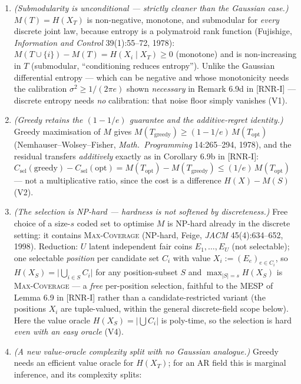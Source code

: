 \documentclass[
]{article}
\begin{document}
\begin{enumerate}
\item \emph{(Submodularity is unconditional --- strictly cleaner than the
Gaussian case.)} $M(T)=H(X_T)$ is non-negative, monotone, and submodular
for \emph{every} discrete joint law, because entropy is a polymatroid rank
function (Fujishige, \emph{Information and Control} 39(1):55--72, 1978):
$M(T\cup\{i\})-M(T)=H(X_i\mid X_T)\ge 0$ (monotone) and is non-increasing in
$T$ (submodular, ``conditioning reduces entropy''). Unlike the Gaussian
differential entropy --- which can be negative and whose monotonicity needs
the calibration $\sigma^2\ge 1/(2\pi e)$ shown \emph{necessary} in Remark
6.9d in [RNR-I] --- discrete entropy needs \emph{no} calibration: that noise floor
simply vanishes (V1).
\item \emph{(Greedy retains the $(1-1/e)$ guarantee and the additive-regret
identity.)} Greedy maximisation of $M$ gives $M(T_{\mathrm{greedy}})\ge
(1-1/e)\,M(T_{\mathrm{opt}})$ (Nemhauser--Wolsey--Fisher, \emph{Math.\
Programming} 14:265--294, 1978), and the residual transfers \emph{additively}
exactly as in Corollary 6.9b in [RNR-I]: $C_{\mathrm{sel}}(\text{greedy}) -
C_{\mathrm{sel}}(\text{opt}) = M(T_{\mathrm{opt}}) - M(T_{\mathrm{greedy}})
\le (1/e)\,M(T_{\mathrm{opt}})$ --- not a multiplicative ratio, since the cost
is a difference $H(X)-M(S)$ (V2).
\item \emph{(The selection is NP-hard --- hardness is \emph{not} softened by
discreteness.)} Free choice of a size-$s$ coded set to optimise $M$ is
NP-hard already in the discrete setting: it contains \textsc{Max-Coverage}
(NP-hard, Feige, \emph{JACM} 45(4):634--652, 1998). Reduction: $U$ latent
independent fair coins $E_1,\dots,E_U$ (not selectable); one selectable
\emph{position} per candidate set $C_i$ with value $X_i:=(E_e)_{e\in C_i}$,
so $H(X_S)=\bigl|\bigcup_{i\in S} C_i\bigr|$ for any position-subset $S$ and
$\max_{|S|=s}H(X_S)$ is \textsc{Max-Coverage} --- a \emph{free} per-position
selection, faithful to the MESP of Lemma 6.9 in [RNR-I] rather than a candidate-restricted
variant (the positions $X_i$ are tuple-valued, within the general
discrete-field scope below). Here the value oracle $H(X_S)=|\bigcup C_i|$ is
poly-time, so the selection is hard \emph{even with an easy oracle} (V4).
\item \emph{(A new value-oracle complexity split with no Gaussian analogue.)}
Greedy needs an efficient value oracle for $H(X_T)$; for an AR field this is
marginal inference, and its complexity splits:
\begin{itemize}

\end{itemize}
\end{enumerate}
\end{document}
